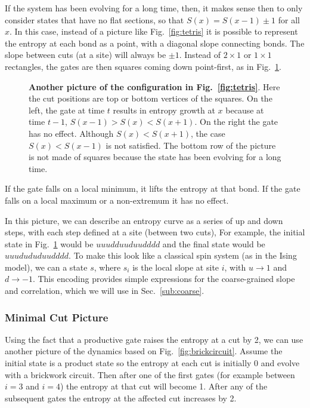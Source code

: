 If the system has been evolving for a long time, then, it makes sense then to only consider states that have no flat sections, so that $S(x) = S(x-1)\pm1$ for all $x$. In this case, instead of a picture like Fig.~\ref{fig:tetris} it is possible to represent the entropy at each bond as a point, with a diagonal slope connecting bonds. The slope between cuts (at a site) will always be $\pm1$. Instead of $2\times1$ or $1\times1$ rectangles, the gates are then squares coming down point-first, as in Fig.~\ref{fig:diaggate}. 
\begin{figure}
	\centering
	
	\caption{\textbf{Another picture of the configuration in Fig.~\ref{fig:tetris}}. Here the cut positions are top or bottom vertices of the squares. On the left, the gate at time $t$ results in entropy growth at $x$ because at time $t-1$, $S(x-1) > S(x) < S(x+1)$. On the right the gate has no effect. Although $S(x) < S(x+1)$, the case $S(x) < S(x-1)$ is not satisfied. The bottom row of the picture is not made of squares because the state has been evolving for a long time.}
	\label{fig:diaggate}
\end{figure}
If the gate falls on a local minimum, it lifts the entropy at that bond. If the gate falls on a local maximum or a non-extremum it has no effect.

In this picture, we can describe an entropy curve as a series of up and down steps, with each step defined at a site (between two cuts), For example, the initial state in Fig.~\ref{fig:diaggate} would be $uuudduuduudddd$ and the final state would be $uuudududuudddd$. To make this look like a classical spin system (as in the Ising model), we can a state $s$, where $s_i$ is the local slope at site $i$, with $u\to1$ and $d\to-1$. This encoding provides simple expressions for the coarse-grained slope and correlation, which we will use in Sec.~\ref{sub:coarse}.

\subsubsection{Minimal Cut Picture} \label{subsub:mincut}

Using the fact that a productive gate raises the entropy at a cut by 2, we can use another picture of the dynamics based on Fig.~\ref{fig:brickcircuit}. Assume the initial state is a product state so the entropy at each cut is initially 0 and evolve with a brickwork circuit. Then after one of the first gates (for example between $i=3$ and $i=4$) the entropy at that cut will become 1. After any of the subsequent gates the entropy at the affected cut increases by 2.

